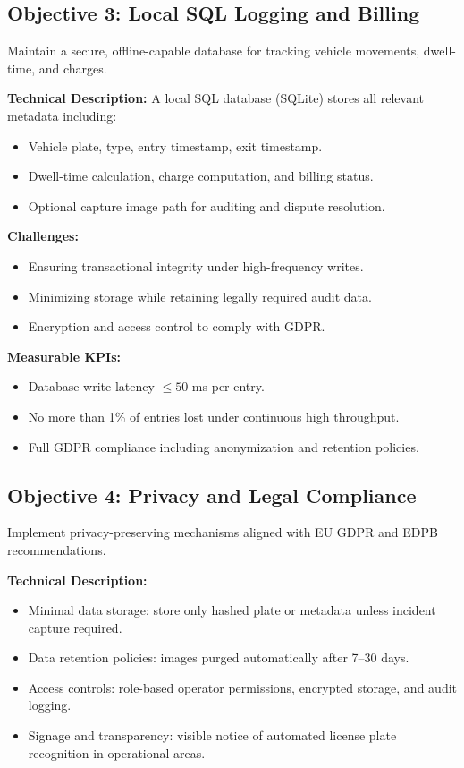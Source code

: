 	\subsection{Objective 3: Local SQL Logging and Billing}
	Maintain a secure, offline-capable database for tracking vehicle movements, dwell-time, and charges.
	
	\textbf{Technical Description:}  
	A local SQL database (SQLite) stores all relevant metadata including:
	\begin{itemize}
		\item Vehicle plate, type, entry timestamp, exit timestamp.
		\item Dwell-time calculation, charge computation, and billing status.
		\item Optional capture image path for auditing and dispute resolution.
	\end{itemize}
	
	\textbf{Challenges:}  
	\begin{itemize}
		\item Ensuring transactional integrity under high-frequency writes.
		\item Minimizing storage while retaining legally required audit data.
		\item Encryption and access control to comply with GDPR.
	\end{itemize}
	
	\textbf{Measurable KPIs:}  
	\begin{itemize}
		\item Database write latency $\leq 50$ ms per entry.
		\item No more than 1\% of entries lost under continuous high throughput.
		\item Full GDPR compliance including anonymization and retention policies.
	\end{itemize}
	
	\subsection{Objective 4: Privacy and Legal Compliance}
	Implement privacy-preserving mechanisms aligned with EU GDPR and EDPB recommendations.
	
	\textbf{Technical Description:}  
	\begin{itemize}
		\item Minimal data storage: store only hashed plate or metadata unless incident capture required.
		\item Data retention policies: images purged automatically after 7--30 days.
		\item Access controls: role-based operator permissions, encrypted storage, and audit logging.
		\item Signage and transparency: visible notice of automated license plate recognition in operational areas.
	\end{itemize}
	
